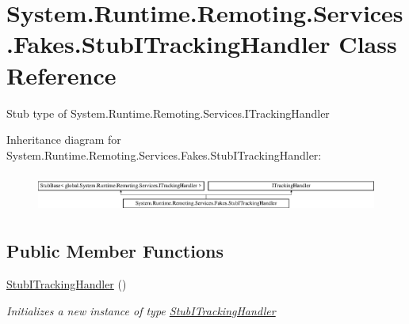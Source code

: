 \hypertarget{class_system_1_1_runtime_1_1_remoting_1_1_services_1_1_fakes_1_1_stub_i_tracking_handler}{\section{System.\-Runtime.\-Remoting.\-Services.\-Fakes.\-Stub\-I\-Tracking\-Handler Class Reference}
\label{class_system_1_1_runtime_1_1_remoting_1_1_services_1_1_fakes_1_1_stub_i_tracking_handler}
}


Stub type of System.\-Runtime.\-Remoting.\-Services.\-I\-Tracking\-Handler 


Inheritance diagram for System.\-Runtime.\-Remoting.\-Services.\-Fakes.\-Stub\-I\-Tracking\-Handler\-:\begin{figure}[H]
\begin{center}
\leavevmode
\includegraphics[height=1.293303cm]{class_system_1_1_runtime_1_1_remoting_1_1_services_1_1_fakes_1_1_stub_i_tracking_handler}
\end{center}
\end{figure}
\subsection*{Public Member Functions}
\begin{DoxyCompactItemize}
\item 
\hyperlink{class_system_1_1_runtime_1_1_remoting_1_1_services_1_1_fakes_1_1_stub_i_tracking_handler_afb2ace0877ebb7e0336d225dcff033bb}{Stub\-I\-Tracking\-Handler} ()
\begin{DoxyCompactList}\small\item\em Initializes a new instance of type \hyperlink{class_system_1_1_runtime_1_1_remoting_1_1_services_1_1_fakes_1_1_stub_i_tracking_handler}{Stub\-I\-Tracking\-Handler}\end{DoxyCompactList}\end{DoxyCompactItemize}
